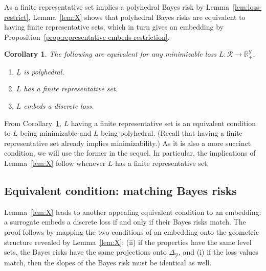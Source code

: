 \documentclass[11pt]{article}
\newcommand{\reals}{\mathbb{R}}
\newcommand{\simplex}{\Delta_\Y}
\newcommand{\R}{\mathcal{R}}
\newcommand{\Y}{\mathcal{Y}}
\newcommand{\risk}[1]{\underline{#1}}
\newtheorem{corollary}{Corollary}
\begin{document}
As a finite representative set implies a polyhedral Bayes risk by Lemma~\ref{lem:loss-restrict}, Lemma~\ref{lem:X} shows that polyhedral Bayes risks are equivalent to having finite representative sets, which in turn gives an embedding by
Proposition~\ref{prop:representative-embeds-restriction}.
\begin{corollary}\label{cor:poly-risk-fin-rep}
  The following are equivalent for any minimizable loss $L:\R\to\reals^\Y_+$.
  \begin{enumerate}
  \item $\risk{L}$ is polyhedral.
  \item $L$ has a finite representative set.
  \item $L$ embeds a discrete loss.
  \end{enumerate}
\end{corollary}
From Corollary~\ref{cor:poly-risk-fin-rep}, $L$ having a finite representative set is an equivalent condition to $L$ being minimizable and $\risk{L}$ being polyhedral.
(Recall that having a finite representative set already implies minimizability.)
As it is also a more succinct condition, we will use the former in the sequel.
In particular, the implications of Lemma~\ref{lem:X} follow whenever $L$ has a finite representative set.


\subsection{Equivalent condition: matching Bayes risks}\label{subsec:match-BR}


Lemma~\ref{lem:X} leads to another appealing equivalent condition to an embedding: a surrogate embeds a discrete loss if and only if their Bayes risks match.
The proof follows by mapping the two conditions of an embedding onto the geometric structure revealed by Lemma~\ref{lem:X}: (ii) if the properties have the same level sets, the Bayes risks have the same projections onto $\simplex$, and (i) if the loss values match, then the slopes of the Bayes risk must be identical as well.
\end{document}
